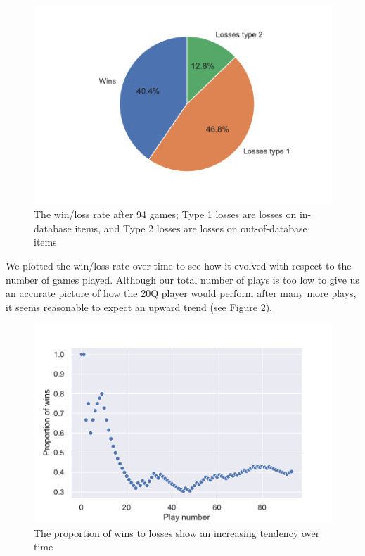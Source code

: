 \documentclass[11pt,a4paper]{article}
\begin{document}
{\begin{figure}
    \centering
    \includegraphics[width=\linewidth]{graphics/pie_detailed-winsLosses.pdf}
    \caption{The win/loss rate after 94 games; Type 1 losses are losses on in-database items, and Type 2 losses are losses on out-of-database items}
    \label{fig:wins-losses}
\end{figure}

We plotted the win/loss rate over time to see how it evolved with respect to the number of games played. Although our total number of plays is too low to give us an accurate picture of how the 20Q player would perform after many more plays, it seems reasonable to expect an upward trend (see Figure \ref{fig:win-over-time}).

\begin{figure}
    \centering
    \includegraphics[scale = .5]{graphics/stats-eval.pdf}
    \caption{The proportion of wins to losses show an increasing tendency over time}
    \label{fig:win-over-time}
\end{figure}

}
\end{document}
